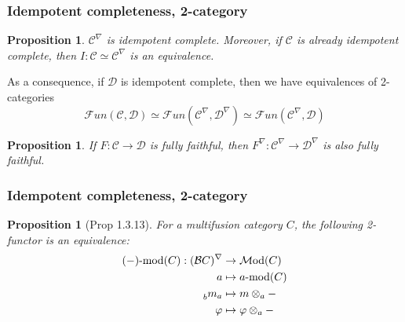 \documentclass{beamer}
\newcommand{\tnsr}{\otimes}
\newcommand{\vphi}{\varphi}
\newtheorem{proposition}[theorem]{Proposition}
\newcommand{\cB}{{\mathcal{B}}}
\newcommand{\cC}{{\mathcal{C}}}
\newcommand{\cD}{{\mathcal{D}}}
\newcommand{\cFun}{{\mathcal{F}un}}
\newcommand{\amod}[1]{{#1\textrm{-mod}}}
\newcommand{\Mod}{{\mathcal{M}\textrm{od}}}
\newcommand{\ModA}[1]{{\Mod(#1)}}
\begin{document}
\begin{frame}
\frametitle{Idempotent completeness, 2-category}

\begin{proposition}
$\cC^\nabla$ is idempotent complete.
Moreover, if $\cC$ is already idempotent complete,
then $I: \cC \simeq \cC^\nabla$ is an equivalence.
\end{proposition}

\pause

As a consequence, if $\cD$ is idempotent complete,
then we have equivalences of 2-categories
\[
\cFun(\cC,\cD) \simeq \cFun(\cC^\nabla,\cD^\nabla)
\simeq \cFun(\cC^\nabla, \cD)
\]

\pause

\begin{proposition}
If $F: \cC \to \cD$ is fully faithful,
then $F^\nabla: \cC^\nabla \to \cD^\nabla$
is also fully faithful.
\end{proposition}

\end{frame}

\begin{frame}
\frametitle{Idempotent completeness, 2-category}


\begin{proposition}[\cite{DRfusion}{Prop 1.3.13}]
\label{p:modC-deloop}
For a multifusion category $C$,
the following 2-functor is an equivalence:
\begin{align*}
\amod{(-)}(C): (\cB C)^\nabla
	& \to
	\ModA{C}
\\
a & \mapsto
	\amod{a}(C)
\\
\prescript{}{b}m_a & \mapsto
	m \tnsr_a -
\\
\vphi & \mapsto
\vphi \tnsr_a -
\end{align*}
\end{proposition}

\end{frame}
\end{document}
